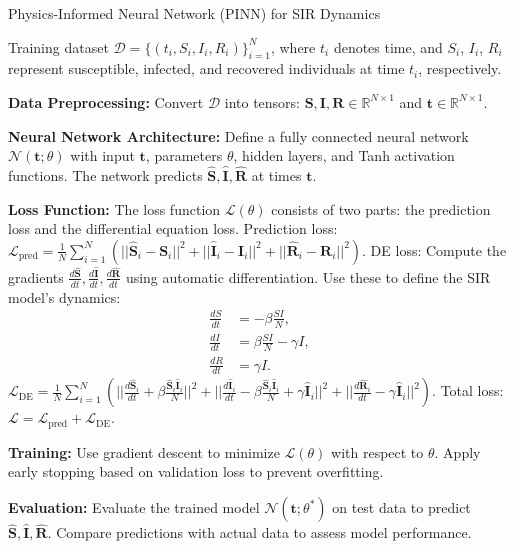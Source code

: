 \documentclass[12pt, letterpaper]{report}
\begin{document}
\begin{algorithm}
\caption{Physics-Informed Neural Network (PINN) for SIR Dynamics}
\begin{algorithmic}[1]

\Require Training dataset $\mathcal{D} = \{(t_i, S_i, I_i, R_i)\}_{i=1}^{N}$, where $t_i$ denotes time, and $S_i$, $I_i$, $R_i$ represent susceptible, infected, and recovered individuals at time $t_i$, respectively.

\State \textbf{Data Preprocessing:}
\State Convert $\mathcal{D}$ into tensors: $\mathbf{S}, \mathbf{I}, \mathbf{R} \in \mathbb{R}^{N \times 1}$ and $\mathbf{t} \in \mathbb{R}^{N \times 1}$.

\State \textbf{Neural Network Architecture:}
\State Define a fully connected neural network $\mathcal{N}(\mathbf{t}; \theta)$ with input $\mathbf{t}$, parameters $\theta$, hidden layers, and Tanh activation functions. The network predicts $\hat{\mathbf{S}}, \hat{\mathbf{I}}, \hat{\mathbf{R}}$ at times $\mathbf{t}$.

\State \textbf{Loss Function:}
\State The loss function $\mathcal{L}(\theta)$ consists of two parts: the prediction loss and the differential equation loss.
\State Prediction loss: $\mathcal{L}_{\text{pred}} = \frac{1}{N}\sum_{i=1}^{N} \left( ||\hat{\mathbf{S}}_i - \mathbf{S}_i||^2 + ||\hat{\mathbf{I}}_i - \mathbf{I}_i||^2 + ||\hat{\mathbf{R}}_i - \mathbf{R}_i||^2 \right)$.
\State DE loss: Compute the gradients $\frac{d\hat{\mathbf{S}}}{dt}, \frac{d\hat{\mathbf{I}}}{dt}, \frac{d\hat{\mathbf{R}}}{dt}$ using automatic differentiation. Use these to define the SIR model's dynamics:
\begin{align*}
\frac{dS}{dt} &= -\beta \frac{SI}{N}, \\
\frac{dI}{dt} &= \beta \frac{SI}{N} - \gamma I, \\
\frac{dR}{dt} &= \gamma I.
\end{align*}
\State $\mathcal{L}_{\text{DE}} = \frac{1}{N}\sum_{i=1}^{N} \left( ||\frac{d\hat{\mathbf{S}}_i}{dt} + \beta \frac{\hat{\mathbf{S}}_i \hat{\mathbf{I}}_i}{N}||^2 + ||\frac{d\hat{\mathbf{I}}_i}{dt} - \beta \frac{\hat{\mathbf{S}}_i \hat{\mathbf{I}}_i}{N} + \gamma \hat{\mathbf{I}}_i||^2 + ||\frac{d\hat{\mathbf{R}}_i}{dt} - \gamma \hat{\mathbf{I}}_i||^2 \right)$.
\State Total loss: $\mathcal{L} = \mathcal{L}_{\text{pred}} + \mathcal{L}_{\text{DE}}$.

\State \textbf{Training:}
\State Use gradient descent to minimize $\mathcal{L}(\theta)$ with respect to $\theta$.
\State Apply early stopping based on validation loss to prevent overfitting.

\State \textbf{Evaluation:}
\State Evaluate the trained model $\mathcal{N}(\mathbf{t}; \theta^*)$ on test data to predict $\hat{\mathbf{S}}, \hat{\mathbf{I}}, \hat{\mathbf{R}}$.
\State Compare predictions with actual data to assess model performance.

\end{algorithmic}
\end{algorithm}
\end{document}
